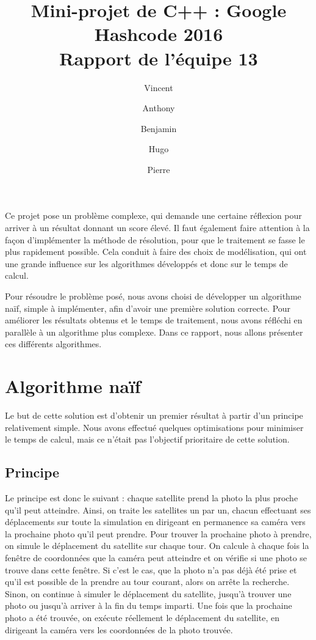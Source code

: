 \documentclass[11pt]{article}
\title{Mini-projet de C++ : Google Hashcode 2016\\Rapport de l'équipe 13}
\author{Vincent \bsc{Cotineau} \and Anthony \bsc{Griffon} \and Benjamin \bsc{Landry} \and Hugo \bsc{Pigeon} \and Pierre \bsc{Pétillon}}
\begin{document}
	\maketitle
	
	Ce projet pose un problème complexe, qui demande une certaine réflexion pour arriver à un résultat donnant un score élevé. Il faut également faire attention à la façon d'implémenter la méthode de résolution, pour que le traitement se fasse le plus rapidement possible. Cela conduit à faire des choix de modélisation, qui ont une grande influence sur les algorithmes développés et donc sur le temps de calcul.
	
	Pour résoudre le problème posé, nous avons choisi de développer un algorithme naïf, simple à implémenter, afin d'avoir une première solution correcte. Pour améliorer les résultats obtenus et le temps de traitement, nous avons réfléchi en parallèle à un algorithme plus complexe. Dans ce rapport, nous allons présenter ces différents algorithmes.

	\section{Algorithme naïf}
		
			Le but de cette solution est d'obtenir un premier résultat à partir d'un principe relativement simple. Nous avons effectué quelques optimisations pour minimiser le temps de calcul, mais ce n'était pas l'objectif prioritaire de cette solution.
	
		\subsection{Principe}
			
			Le principe est donc le suivant : chaque satellite prend la photo la plus proche qu'il peut atteindre. Ainsi, on traite les satellites un par un, chacun effectuant ses déplacements sur toute la simulation en dirigeant en permanence sa caméra vers la prochaine photo qu'il peut prendre. Pour trouver la prochaine photo à prendre, on simule le déplacement du satellite sur chaque tour. On calcule à chaque fois la fenêtre de coordonnées que la caméra peut atteindre et on vérifie si une photo se trouve dans cette fenêtre. Si c'est le cas, que la photo n'a pas déjà été prise et qu'il est possible de la prendre au tour courant, alors on arrête la recherche. Sinon, on continue à simuler le déplacement du satellite, jusqu'à trouver une photo ou jusqu'à arriver à la fin du temps imparti. Une fois que la prochaine photo a été trouvée, on exécute réellement le déplacement du satellite, en dirigeant la caméra vers les coordonnées de la photo trouvée.
		
\end{document}
